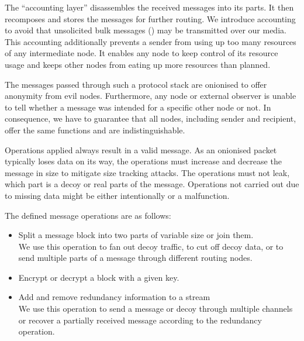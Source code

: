 The ``accounting layer'' disassembles the received messages into its parts. It then recomposes and stores the messages for further routing. We introduce accounting to avoid that unsolicited bulk messages () may be transmitted over our media. This accounting additionally prevents a sender from using up too many resources of any intermediate node. It enables any node to keep control of its resource usage and keeps other nodes from eating up more resources than planned.

The messages passed through such a protocol stack are onionised to offer anonymity from evil nodes. Furthermore, any node or external observer is unable to tell whether a message was intended for a specific other node or not. In consequence, we have to guarantee that all nodes, including sender and recipient, offer the same functions and are indistinguishable.

Operations applied always result in a valid message. As an onionised packet typically loses data on its way, the operations must increase and decrease the message in size to mitigate size tracking attacks. The operations must not leak, which part is a decoy or real parts of the message. Operations not carried out due to missing data might be either intentionally or a malfunction.

The defined message operations are as follows:
\begin{itemize}
	\item Split a message block into two parts of variable size or join them.\\
	We use this operation to fan out decoy traffic, to cut off decoy data, or to send multiple parts of a message through different routing nodes.
	\item Encrypt or decrypt a block with a given key.      
	\item Add and remove redundancy information to a stream\\
	We use this operation to send a message or decoy through multiple channels or recover a partially received message according to the redundancy operation.
\end{itemize}

